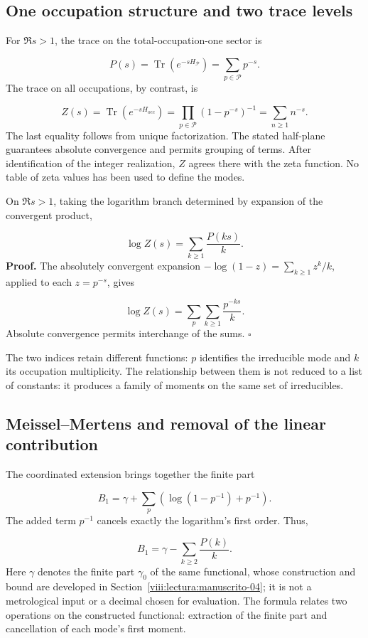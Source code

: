 \subsection{One occupation structure and two trace levels}
For $\Re s>1$, the trace on the total-occupation-one sector is

\[
P(s)=\operatorname{Tr}(e^{-sH_{\mathcal P}})=\sum_{p\in\mathcal P}p^{-s}.
\]
The trace on all occupations, by contrast, is

\[
Z(s)=\operatorname{Tr}(e^{-sH_{\mathrm{occ}}})
=\prod_{p\in\mathcal P}(1-p^{-s})^{-1}
=\sum_{n\ge1}n^{-s}.
\]
The last equality follows from unique factorization. The stated half-plane guarantees absolute convergence and permits grouping of terms. After identification of the integer realization, $Z$ agrees there with the zeta function. No table of zeta values has been used to define the modes.

On $\Re s>1$, taking the logarithm branch determined by expansion of the convergent product,

\[
\log Z(s)=\sum_{k\ge1}\frac{P(ks)}{k}.
\]
\textbf{Proof.} The absolutely convergent expansion $-\log(1-z)=\sum_{k\ge1}z^k/k$, applied to each $z=p^{-s}$, gives

\[
\log Z(s)=\sum_p\sum_{k\ge1}\frac{p^{-ks}}k.
\]
Absolute convergence permits interchange of the sums. \hfill\(\square\)

The two indices retain different functions: $p$ identifies the irreducible mode and $k$ its occupation multiplicity. The relationship between them is not reduced to a list of constants: it produces a family of moments on the same set of irreducibles.

\subsection{Meissel–Mertens and removal of the linear contribution}
The coordinated extension brings together the finite part

\[
B_1=\gamma+\sum_p\left(\log(1-p^{-1})+p^{-1}\right).
\]
The added term $p^{-1}$ cancels exactly the logarithm's first order. Thus,

\[
B_1=\gamma-\sum_{k\ge2}\frac{P(k)}k.
\]
Here $\gamma$ denotes the finite part $\gamma_0$ of the same functional, whose construction and bound are developed in Section~\ref{viii:lectura:manuscrito-04}; it is not a metrological input or a decimal chosen for evaluation. The formula relates two operations on the constructed functional: extraction of the finite part and cancellation of each mode's first moment.

